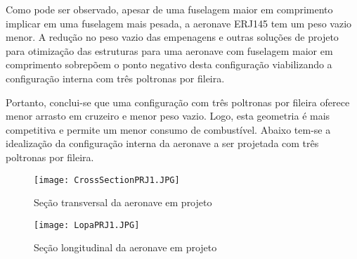 Como pode ser observado, apesar de uma fuselagem maior em comprimento implicar em uma fuselagem mais pesada, a aeronave ERJ145 tem um peso vazio menor.
A redução no peso vazio das empenagens e outras soluções de projeto para otimização das estruturas para uma aeronave com fuselagem maior em comprimento sobrepõem o ponto negativo desta configuração viabilizando a configuração interna com três poltronas por fileira.

Portanto, conclui-se que uma configuração com três poltronas por fileira oferece menor arrasto em cruzeiro e menor peso vazio.
Logo, esta geometria é mais competitiva e permite um menor consumo de combustível.
Abaixo tem-se a idealização da configuração interna da aeronave a ser projetada com três poltronas por fileira. 

\begin{figure}[p]
\centering
\texttt{[image: CrossSectionPRJ1.JPG]}
\caption{Seção transversal da aeronave em projeto}
\end{figure}

\begin{figure}[p]
\texttt{[image: LopaPRJ1.JPG]}
\caption{Seção longitudinal da aeronave em projeto}
\end{figure}
